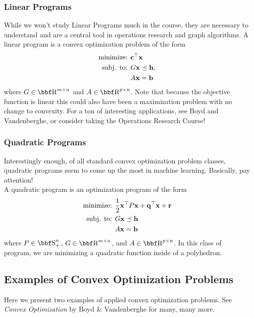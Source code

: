 \documentclass{article}
\begin{document}
\subsubsection{Linear Programs}

While we won't study Linear Programs much in the course, they
are necessary to understand and are a central tool in operations
research and graph algorithms. A linear program is a convex
optimization problem of the form
\begin{align*}
    \text{minimize: } & {\bf c}^\top{\bf x}\\
    \text{subj. to: } & G{\bf x} \preceq {\bf h},\\
                      & A{\bf x} = {\bf b}
\end{align*}
where $G\in\RR^{m\times n}$ and $A\in\RR^{p\times n}$. Note that
because the objective function is linear this could also have been
a maximization problem with no change to convexity. For a ton
of interesting applications, see Boyd and Vandenberghe, or consider
taking the Operations Research Course!

\subsubsection{Quadratic Programs}

Interestingly enough, of all standard convex optimization problem classes,
quadratic programs seem to come up the most in machine learning. Basically,
pay attention!\\

A quadratic program is an optimization program of the form
\begin{align*}
    \text{minimize: } & \frac{1}{2}{\bf x}^\top P{\bf x} + {\bf q}^\top{\bf x} + {\bf r}\\
    \text{subj. to: } & G{\bf x} \preceq{\bf h}\\
                      & A{\bf x} = {\bf b}
\end{align*}
where $P\in\SS_+^n$, $G\in\RR^{m\times n}$, and $A\in\RR^{p\times n}$.
In this class of program, we are minimizing a quadratic function inside
of a polyhedron.

\subsection{Examples of Convex Optimization Problems}

Here we present two examples of applied convex optimization
problems. See \textit{Convex Optimization} by Boyd \&
Vandenberghe for many, many more.
\end{document}
